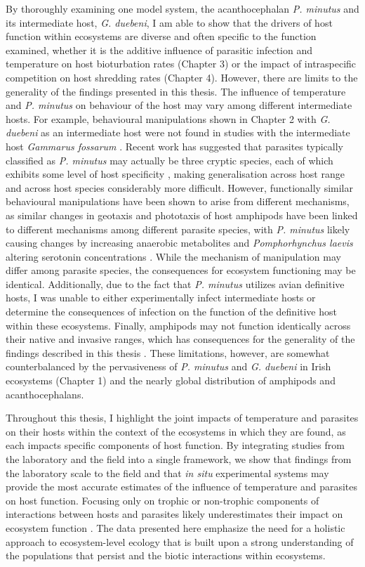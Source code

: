 By thoroughly examining one model system, the acanthocephalan \emph{P. minutus} and its intermediate host, \emph{G. duebeni}, I am able to show that the drivers of host function within ecosystems are diverse and often specific to the function examined, whether it is the additive influence of parasitic infection and temperature on host bioturbation rates (Chapter 3) or the impact of intraspecific competition on host shredding rates (Chapter 4). However, there are limits to the generality of the findings presented in this thesis. The influence of temperature and \emph{P. minutus} on behaviour of the host may vary among different intermediate hosts. For example, behavioural manipulations shown in Chapter 2 with \emph{G. duebeni} as an intermediate host were not found in studies with the intermediate host \emph{Gammarus fossarum} \citep{labaude2017}. Recent work has suggested that parasites typically classified as \emph{P. minutus} may actually be three cryptic species, each of which exhibits some level of host specificity \citep{zittel2018}, making generalisation across host range and across host species considerably more difficult. However, functionally similar behavioural manipulations have been shown to arise from different mechanisms, as similar changes in geotaxis and phototaxis of host amphipods have been linked to different mechanisms among different parasite species, with \emph{P. minutus} likely causing changes by increasing anaerobic metabolites \citep{perrot2016} and \emph{Pomphorhynchus laevis} altering serotonin concentrations \citep{perrot2014}. While the mechanism of manipulation may differ among parasite species, the consequences for ecosystem functioning may be identical. Additionally, due to the fact that \emph{P. minutus} utilizes avian definitive hosts, I was unable to either experimentally infect intermediate hosts or determine the consequences of infection on the function of the definitive host within these ecosystems. Finally, amphipods may not function identically across their native and invasive ranges, which has consequences for the generality of the findings described in this thesis \citep{little2018, tonin2018}. These limitations, however, are somewhat counterbalanced by the pervasiveness of \emph{P. minutus} and \emph{G. duebeni} in Irish ecosystems (Chapter 1) and the nearly global distribution of amphipods and acanthocephalans.

Throughout this thesis, I highlight the joint impacts of temperature and parasites on their hosts within the context of the ecosystems in which they are found, as each impacts specific components of host function. By integrating studies from the laboratory and the field into a single framework, we show that findings from the laboratory scale to the field and that \emph{in situ} experimental systems may provide the most accurate estimates of the influence of temperature and parasites on host function. Focusing only on trophic or non-trophic components of interactions between hosts and parasites likely underestimates their impact on ecosystem function \citep{buck2018}. The data presented here emphasize the need for a holistic approach to ecosystem-level ecology that is built upon a strong understanding of the populations that persist and the biotic interactions within ecosystems. 

